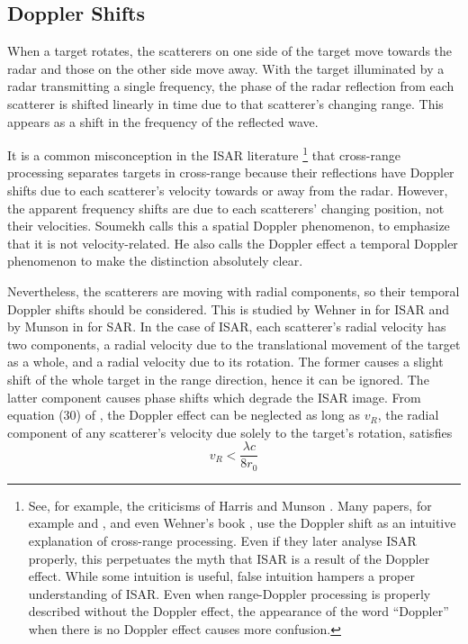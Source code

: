 \subsection{Doppler Shifts}
\label{hrr sec:doppler}

When a target rotates, the scatterers on one side of the target move towards
the radar and those on the other side move away.  With the target
illuminated by a radar transmitting a single frequency, the phase of the
radar reflection from each scatterer is shifted linearly in time due to that
scatterer's changing range.  This appears as a shift in the frequency of
the reflected wave.  

It is a common misconception in the ISAR literature%
\footnote{See, for example, the criticisms of Harris \protect\cite{Har90a}
and Munson \protect\cite{Mun89}.  Many papers, for example 
\protect\cite{Aus84} and \protect\cite{Wal80}, and even Wehner's book
\protect\cite{Weh87}, use the Doppler shift as an intuitive explanation of
cross-range processing.  Even if they later analyse ISAR properly, this
perpetuates the myth that ISAR is a result of the Doppler effect.  While
some intuition is useful, false intuition hampers a proper understanding of
ISAR.  Even when range-Doppler processing is properly described without the
Doppler effect, the appearance of the word ``Doppler'' when there is no 
Doppler effect causes more confusion.}
that cross-range processing separates targets in cross-range because their
reflections have Doppler shifts due to each scatterer's velocity towards or
away from the radar.  However, the apparent frequency shifts are due to each
scatterers' changing position, not their velocities.  Soumekh \cite{Sou94}
calls this a spatial Doppler phenomenon, to emphasize that it is not 
velocity-related.  He also calls the Doppler effect a temporal Doppler
phenomenon to make the distinction absolutely clear.

Nevertheless, the scatterers are moving with radial components, so their
temporal Doppler shifts should be considered.  This is studied by Wehner in
\cite{Weh87} for ISAR and by Munson in \cite{Mun83} for SAR.  In the case of
ISAR, each scatterer's radial velocity has two components, a radial velocity
due to the translational movement of the target as a whole, and a radial
velocity due to its rotation.  The former causes a slight shift of the whole
target in the range direction, hence it can be ignored.  The latter
component causes phase shifts which degrade the ISAR image.  From equation
(30) of \cite{Mun83}, the Doppler effect can be neglected as long as $v_R$,
the radial component of any scatterer's velocity due solely to the target's 
rotation, satisfies
\begin{equation}
v_R<\frac{\lambda c}{8r_0}
\end{equation}

